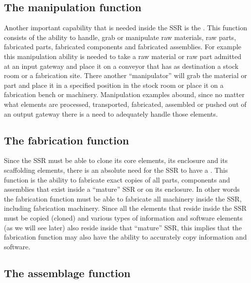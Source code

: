 \subsection[The manipulation function]{The manipulation function}
Another important capability that
is needed inside the SSR is the . This
function consists of the ability to handle, grab or manipulate raw
materials, raw parts, fabricated parts, fabricated components and
fabricated assemblies. For example this manipulation ability is needed
to take a raw material or raw part admitted at an input gateway and
place it on a conveyor that has as destination a stock room or a
fabrication site. There another “manipulator” will grab the material or
part and place it in a specified position in the stock room or place it
on a fabrication bench or machinery. Manipulation examples abound,
since no matter what elements are processed, transported, fabricated,
assembled or pushed out of an output gateway there is a need to
adequately handle those elements.

\subsection[The fabrication function]{The fabrication function}

Since the SSR must be able to
clone its core elements, its enclosure and its scaffolding elements,
there is an absolute need for the SSR to have a . 
This function is the ability to fabricate exact copies of
all parts, components and assemblies that exist inside a “mature” SSR
or on its enclosure. In other words the fabrication function must be
able to fabricate all machinery inside the SSR, including fabrication
machinery. Since all the elements that reside inside the SSR must be
copied (cloned) and various types of information and software elements
(as we will see later) also reside inside that “mature” SSR, this implies
that the fabrication function may also have the ability to
accurately copy information and software.

\subsection[The assemblage function]{The assemblage function}

